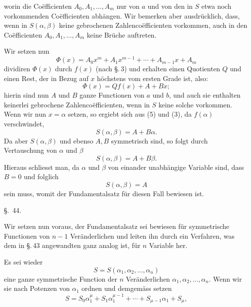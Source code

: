 
worin die Coëfficienten $A_0,A_1,\ldots,A_m$ nur von $a$ und von den in $S$ etwa noch vorkommenden Coëfficienten abhängen. Wir bemerken aber ausdrücklich, dass, wenn in $S(\alpha,\beta)$ keine gebrochenen Zahlencoëfficienten vorkommen, auch in den Coëfficienten $A_0,A_1,\ldots,A_m$ keine Brüche auftreten.

Wir setzen nun
\begin{equation}
 \Phi(x)=A_0x^m+A_1x^{m-1}+\cdots+A_{m-1}x+A_m
\tag{4}
\end{equation}
dividiren $\Phi(x)$ durch $f(x)$ (nach \S.\,3) und erhalten einen Quotienten $Q$ und einen Rest, der in Bezug auf $x$ höchstens vom ersten Grade ist, also:
\begin{equation}
 \Phi(x)=Qf(x)+A+Bx;
\tag{5}
\end{equation}
hierin sind nun $A$ und $B$ ganze Functionen von $a$ und $b$, und auch sie enthalten keinerlei gebrochene Zahlencoëfficienten, wenn in $S$ keine solche vorkommen. Wenn wir nun $x=\alpha$ setzen, so ergiebt sich aus (5) und (3), da $f(\alpha)$ verschwindet,
\begin{equation}
 S(\alpha,\beta)=A+B\alpha.
\tag{6}
\end{equation}
Da aber $S(\alpha,\beta)$ und ebenso $A,B$ symmetrisch sind, so folgt durch Vertauschung von $\alpha$ und $\beta$
\begin{equation}
 S(\alpha,\beta)=A+B\beta.
\tag{7}
\end{equation}
Hieraus schliesst man, da $\alpha$ und $\beta$ von einander unabhängige Variable sind, dass $B=0$ und folglich
\begin{equation}
 S(\alpha,\beta)=A
\tag{8}
\end{equation}
sein muss, womit der Fundamentalsatz für diesen Fall bewiesen ist.

\begin{center}
{\large \S.\ 44.}

\vspace{0.5em}
{\large{}}
\end{center}

Wir setzen nun voraus, der Fundamentalsatz sei bewiesen für symmetrische Functionen von \(n-1\) Veränderlichen und leiten ihn durch ein Verfahren, was dem in \S.\,43 angewandten ganz analog ist, für \(n\) Variable her.

Es sei wieder
\begin{equation}
 S=S(\alpha_1,\alpha_2,\ldots,\alpha_n)
\tag{1}
\end{equation}
eine ganze symmetrische Function der \(n\) Veränderlichen \(\alpha_1,\alpha_2,\ldots,\alpha_n\). Wenn wir sie nach Potenzen von \(\alpha_1\) ordnen und demgemäss setzen
\begin{equation}
 S=S_0\alpha_1^\mu+S_1\alpha_1^{\mu-1}+\cdots+S_{\mu-1}\alpha_1+S_\mu,
\tag{2}
\end{equation}
